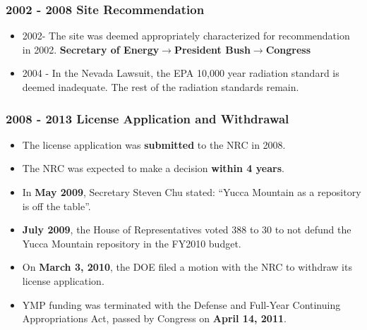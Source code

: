 \begin{frame}[ctb!]
    \frametitle{2002 - 2008 Site Recommendation}
    \begin{itemize}
      \item 2002- The site was deemed appropriately characterized for recommendation in 2002.  \textbf{Secretary of Energy}$\longrightarrow$\textbf{President 
      Bush}$\longrightarrow$\textbf{Congress}
     \item 2004 - In the Nevada Lawsuit, the EPA 10,000 year radiation standard 
       is deemed inadequate. The rest of the radiation standards remain. 
   \end{itemize}
  \end{frame}

\begin{frame}[ctb!]
    \frametitle{2008 - 2013 License Application and Withdrawal}
    \begin{itemize}
      \item The license application was \textbf{submitted} to the NRC in 2008.
      \item The NRC was expected to make a decision \textbf{within 4 years}.
      \item In \textbf{May 2009}, Secretary Steven Chu stated: ``Yucca Mountain as a 
        repository is off the table''.
      \item \textbf{July 2009}, the House of Representatives voted 388 to 30 to 
        not defund the Yucca Mountain repository in the FY2010 budget.
      \item On \textbf{March 3, 2010}, the DOE filed a motion with the NRC to 
        withdraw its license application. 
      \item YMP funding was terminated with the Defense and Full-Year Continuing 
        Appropriations Act, passed by Congress on \textbf{April 14, 2011}.
    \end{itemize}
  \end{frame}



